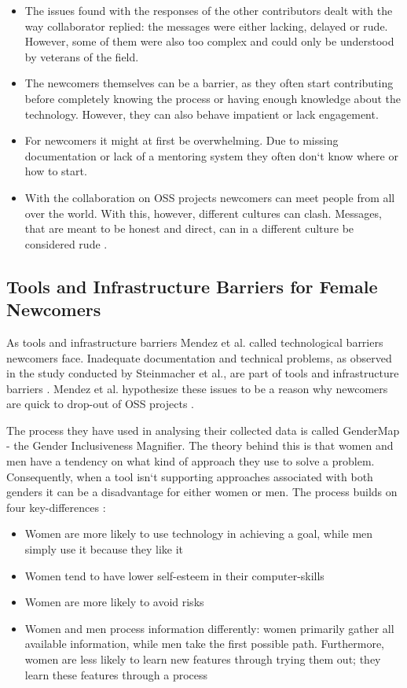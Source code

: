 \documentclass[a4paper, 11pt]{article}
\begin{document}
\begin{itemize}
	\item The issues found with the responses of the other contributors dealt with the way collaborator replied: the messages were either lacking, delayed or rude. However, some of them were also too complex and could only be understood by veterans of the field.
	\item The newcomers themselves can be a barrier, as they often start contributing before completely knowing the process or having enough knowledge about the technology. However, they can also behave impatient or lack engagement.
	\item For newcomers it might at first be overwhelming. Due to missing documentation or lack of a mentoring system they often don‘t know where or how to start.
	\item With the collaboration on OSS projects newcomers can meet people from all over the world. With this, however, different cultures can clash. Messages, that are meant to be honest and direct, can in a different culture be considered rude \cite{social-barriers-newcomer}.
\end{itemize}

\subsection{Tools and Infrastructure Barriers for Female Newcomers}
As tools and infrastructure barriers Mendez et al. called technological barriers newcomers face. Inadequate documentation and technical problems, as observed in the study conducted by Steinmacher et al., are part of tools and infrastructure barriers \cite{open-source-barriers}\cite{social-barriers-newcomer}. Mendez et al. hypothesize these issues to be a reason why newcomers are quick to drop-out of OSS projects \cite{open-source-barriers}. \newline

The process they have used in analysing their collected data is called GenderMap - the Gender Inclusiveness Magnifier. The theory behind this is that women and men have a tendency on what kind of approach they use to solve a problem. Consequently, when a tool isn‘t supporting approaches associated with both genders it can be a disadvantage for either women or men. The process builds on four key-differences \cite{open-source-barriers}:

\begin{itemize}
	\item Women are more likely to use technology in achieving a goal, while men simply use it because they like it
	\item Women tend to have lower self-esteem in their computer-skills
	\item Women are more likely to avoid risks
	\item Women and men process information differently: women primarily gather all available information, while men take the first possible path. Furthermore, women are less likely to learn new features through trying them out; they learn these features through a process \cite{open-source-barriers}
\end{itemize}
\end{document}
